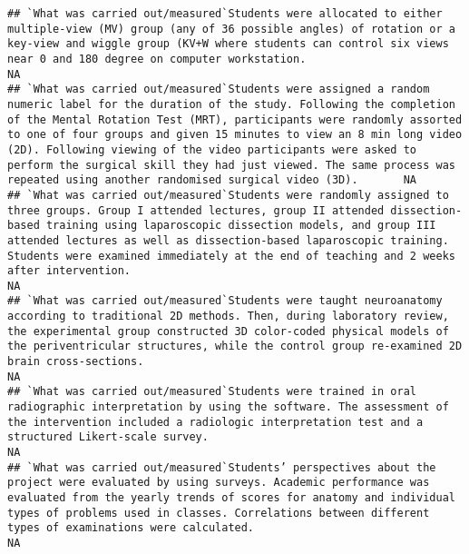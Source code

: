 \documentclass[]{article}
\begin{document}
\begin{verbatim}
## `What was carried out/measured`Students were allocated to either multiple-view (MV) group (any of 36 possible angles) of rotation or a key-view and wiggle group (KV+W where students can control six views near 0 and 180 degree on computer workstation.                                                                                                                                                                                                                            NA
## `What was carried out/measured`Students were assigned a random numeric label for the duration of the study. Following the completion of the Mental Rotation Test (MRT), participants were randomly assorted to one of four groups and given 15 minutes to view an 8 min long video (2D). Following viewing of the video participants were asked to perform the surgical skill they had just viewed. The same process was repeated using another randomised surgical video (3D).       NA
## `What was carried out/measured`Students were randomly assigned to three groups. Group I attended lectures, group II attended dissection-based training using laparoscopic dissection models, and group III attended lectures as well as dissection-based laparoscopic training. Students were examined immediately at the end of teaching and 2 weeks after intervention.                                                                                                             NA
## `What was carried out/measured`Students were taught neuroanatomy according to traditional 2D methods. Then, during laboratory review, the experimental group constructed 3D color-coded physical models of the periventricular structures, while the control group re-examined 2D brain cross-sections.                                                                                                                                                                               NA
## `What was carried out/measured`Students were trained in oral radiographic interpretation by using the software. The assessment of the intervention included a radiologic interpretation test and a structured Likert-scale survey.                                                                                                                                                                                                                                                    NA
## `What was carried out/measured`Students’ perspectives about the project were evaluated by using surveys. Academic performance was evaluated from the yearly trends of scores for anatomy and individual types of problems used in classes. Correlations between different types of examinations were calculated.                                                                                                                                                                      NA

\end{verbatim}
\end{document}
